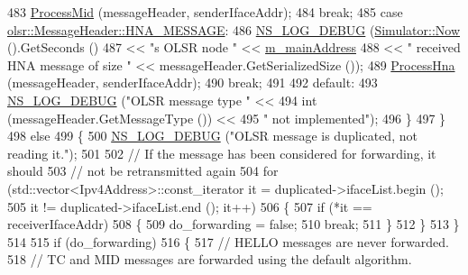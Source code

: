 \begin{DoxyCode}
483               \hyperlink{classns3_1_1olsr_1_1RoutingProtocol_a88dd2a9e226e50034c548787d9d529f3}{ProcessMid} (messageHeader, senderIfaceAddr);
484               \textcolor{keywordflow}{break};
485             \textcolor{keywordflow}{case} \hyperlink{classns3_1_1olsr_1_1MessageHeader_aff5a31b07c415097a5ada41d53e9a99ea12c3f411859a1e9cc5b5442a7fdd2f89}{olsr::MessageHeader::HNA\_MESSAGE}:
486               \hyperlink{group__logging_ga413f1886406d49f59a6a0a89b77b4d0a}{NS\_LOG\_DEBUG} (\hyperlink{classns3_1_1Simulator_ac3178fa975b419f7875e7105be122800}{Simulator::Now} ().GetSeconds ()
487                             << \textcolor{stringliteral}{"s OLSR node "} << \hyperlink{classns3_1_1olsr_1_1RoutingProtocol_a58cc50ed5d1039aab603e90e318aabfb}{m\_mainAddress}
488                             <<  \textcolor{stringliteral}{" received HNA message of size "} << messageHeader.GetSerializedSize ());
489               \hyperlink{classns3_1_1olsr_1_1RoutingProtocol_ab384b31d2faae5b64952052a7eb4eed2}{ProcessHna} (messageHeader, senderIfaceAddr);
490               \textcolor{keywordflow}{break};
491 
492             \textcolor{keywordflow}{default}:
493               \hyperlink{group__logging_ga413f1886406d49f59a6a0a89b77b4d0a}{NS\_LOG\_DEBUG} (\textcolor{stringliteral}{"OLSR message type "} <<
494                             \textcolor{keywordtype}{int} (messageHeader.GetMessageType ()) <<
495                             \textcolor{stringliteral}{" not implemented"});
496             \}
497         \}
498       \textcolor{keywordflow}{else}
499         \{
500           \hyperlink{group__logging_ga413f1886406d49f59a6a0a89b77b4d0a}{NS\_LOG\_DEBUG} (\textcolor{stringliteral}{"OLSR message is duplicated, not reading it."});
501 
502           \textcolor{comment}{// If the message has been considered for forwarding, it should}
503           \textcolor{comment}{// not be retransmitted again}
504           \textcolor{keywordflow}{for} (std::vector<Ipv4Address>::const\_iterator it = duplicated->ifaceList.begin ();
505                it != duplicated->ifaceList.end (); it++)
506             \{
507               \textcolor{keywordflow}{if} (*it == receiverIfaceAddr)
508                 \{
509                   do\_forwarding = \textcolor{keyword}{false};
510                   \textcolor{keywordflow}{break};
511                 \}
512             \}
513         \}
514 
515       \textcolor{keywordflow}{if} (do\_forwarding)
516         \{
517           \textcolor{comment}{// HELLO messages are never forwarded.}
518           \textcolor{comment}{// TC and MID messages are forwarded using the default algorithm.}

\end{DoxyCode}
